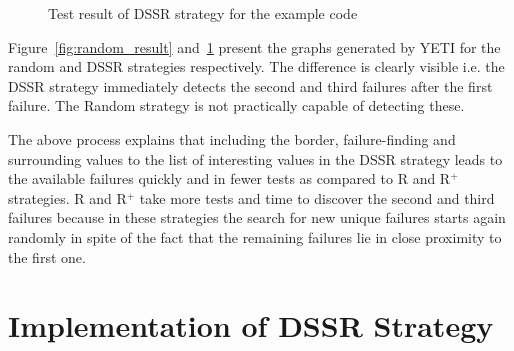 \bigskip

\begin{figure}[H]
\centering
\setlength{\fboxsep}{0pt}%
\setlength{\fboxrule}{1pt}%
\bigskip
\caption{Test result of DSSR strategy for the example code}
\label{fig:dssr_result}
\end{figure}
\bigskip

Figure~\ref{fig:random_result} and~\ref{fig:dssr_result} present the graphs generated by YETI for the random and DSSR strategies respectively. The difference is clearly visible i.e. the DSSR strategy immediately detects the second and third failures after the first failure. The Random strategy is not practically capable of detecting these. 

The above process explains that including the border, failure-finding and surrounding values to the list of interesting values in the DSSR strategy leads to the available failures quickly and in fewer tests as compared to R and R$^+$ strategies. R and R$^+$ take more tests and time to discover the second and third failures because in these strategies the search for new unique failures starts again randomly in spite of the fact that the remaining failures lie in close proximity to the first one.







\section{Implementation of DSSR Strategy}\label{sec:imp}

